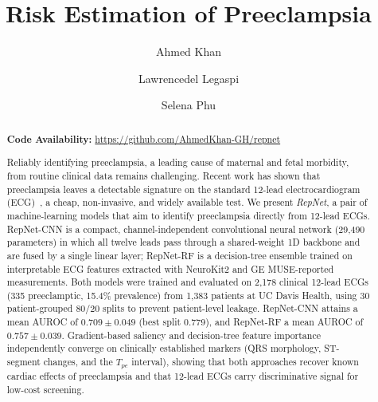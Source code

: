 \documentclass[sigconf,nonacm]{acmart}
\begin{document}
\title{Risk Estimation of Preeclampsia}

\author{Ahmed Khan}

\author{Lawrencedel Legaspi}

\author{Selena Phu}

\begin{abstract}
  \noindent\textbf{Code Availability:} \url{https://github.com/AhmedKhan-GH/repnet}

  \medskip
  Reliably identifying preeclampsia, a leading cause of maternal and
  fetal morbidity, from routine clinical data remains challenging.
  Recent work has shown that preeclampsia leaves a detectable signature
  on the standard 12-lead electrocardiogram
  (ECG)~\cite{butler_ai-based_2024}, a cheap, non-invasive, and widely
  available test. We present \textit{RepNet}, a pair of
  machine-learning models that aim to identify preeclampsia directly from
  12-lead ECGs. RepNet-CNN is a compact,
  channel-independent convolutional neural network (29{,}490 parameters)
  in which all twelve leads pass through a shared-weight 1D backbone and
  are fused by a single linear layer; RepNet-RF is a decision-tree
  ensemble trained on interpretable ECG features extracted with NeuroKit2
  and GE MUSE-reported measurements. Both models were trained and evaluated on 2{,}178
  clinical 12-lead ECGs (335 preeclamptic, 15.4\% prevalence) from 1{,}383
  patients at UC Davis Health, using 30 patient-grouped 80/20 splits to
  prevent patient-level leakage. RepNet-CNN attains a mean AUROC of
  $0.709 \pm 0.049$ (best split 0.779), and RepNet-RF a mean AUROC of
  $0.757 \pm 0.039$. Gradient-based saliency and decision-tree feature
  importance independently converge on clinically established markers
  (QRS morphology, ST-segment changes, and the $T_{pe}$ interval), showing
  that both approaches recover known cardiac effects of preeclampsia and
  that 12-lead ECGs carry discriminative signal for low-cost screening.
\end{abstract}
\end{document}
